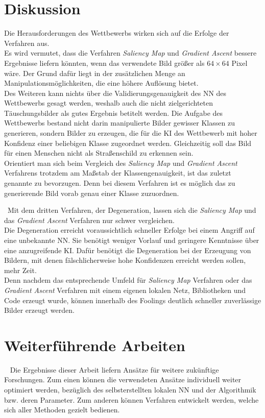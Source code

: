 \section{Diskussion}
Die Herausforderungen des Wettbewerbs wirken sich auf die Erfolge der Verfahren aus.\\
Es wird vermutet, dass die Verfahren \textit{Saliency Map} und \textit{Gradient Ascent} bessere Ergebnisse liefern könnten, wenn das verwendete Bild größer als $64\times64$ Pixel wäre. Der Grund dafür liegt in der zusätzlichen Menge an Manipulationsmöglichkeiten, die eine höhere Auflösung bietet.\\
Des Weiteren kann nichts über die Validierungsgenauigkeit des \ac{NN} des Wettbewerbs gesagt werden, weshalb auch die nicht zielgerichteten Täuschungsbilder als gutes Ergebnis betitelt werden. Die Aufgabe des Wettbewerbs bestand nicht darin manipulierte Bilder gewisser Klassen zu generieren, sondern Bilder zu erzeugen, die für die \ac{KI} des Wettbewerb mit hoher Konfidenz einer beliebigen Klasse zugeordnet werden. Gleichzeitig soll das Bild für einen Menschen nicht als Straßenschild zu erkennen sein.\\
Orientiert man sich beim Vergleich des \textit{Saliency Map} und \textit{Gradient Ascent} Verfahrens trotzdem am Maßstab der Klassengenauigkeit, ist das zuletzt genannte zu bevorzugen. Denn bei diesem Verfahren ist es möglich das zu generierende Bild vorab genau einer Klasse zuzuordnen. 

~\newline Mit dem dritten Verfahren, der Degeneration, lassen sich die \textit{Saliency Map} und das \textit{Gradient Ascent} Verfahren nur schwer vergleichen.\\
Die Degeneration erreicht voraussichtlich schneller Erfolge bei einem Angriff auf eine unbekannte \ac{NN}. Sie benötigt weniger Vorlauf und geringere Kenntnisse über eine anzugreifende \ac{KI}. Dafür benötigt die Degeneration bei der Erzeugung von Bildern, mit denen fälschlicherweise hohe Konfidenzen erreicht werden sollen, mehr Zeit.\\ 
Denn nachdem das entsprechende Umfeld für \textit{Saliency Map} Verfahren oder das \textit{Gradient Ascent} Verfahren mit einem eigenen lokalen Netz, Bibliotheken und Code erzeugt wurde, können innerhalb des Foolings deutlich schneller zuverlässige Bilder erzeugt werden.  

\section{Weiterführende Arbeiten}~\newline 
Die Ergebnisse dieser Arbeit liefern Ansätze für weitere zukünftige Forschungen. Zum einen können die verwendeten Ansätze individuell weiter optimiert werden, bezüglich des selbsterstellten lokalen \acl{NN} und der Algorithmik bzw. deren Parameter. Zum anderen können Verfahren entwickelt werden, welche sich aller Methoden gezielt bedienen. 


